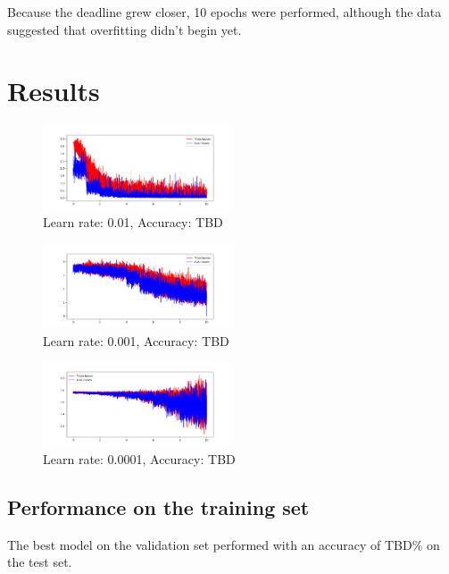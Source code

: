 \documentclass[10pt, a4paper]{scrartcl}
\begin{document}
Because the deadline grew closer, 10 epochs were performed, although the data
suggested that overfitting didn't begin yet.

\section{Results}
\begin{figure}[!htbp]
  \centering
  \includegraphics[width=0.5\textwidth]{lr_0_01.png}
  \caption{Learn rate: 0.01, Accuracy: TBD}
  \label{fig:lr_0.01}
\end{figure}

\begin{figure}[!htbp]
  \centering
  \includegraphics[width=0.5\textwidth]{lr_0_001.png}
  \caption{Learn rate: 0.001, Accuracy: TBD}
  \label{fig:lr_0.001}
\end{figure}

\begin{figure}[!htbp]
  \centering
  \includegraphics[width=0.5\textwidth]{lr_0_0001.png}
  \caption{Learn rate: 0.0001, Accuracy: TBD}
  \label{fig:lr_0.001}
\end{figure}

\subsection{Performance on the training set}
The best model on the validation set performed with an accuracy of TBD\% on the
test set.
\end{document}
